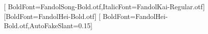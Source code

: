 [
  BoldFont=FandolSong-Bold.otf,ItalicFont=FandolKai-Regular.otf]
[BoldFont=FandolHei-Bold.otf]
[
  BoldFont=FandolHei-Bold.otf,AutoFakeSlant=0.15]
